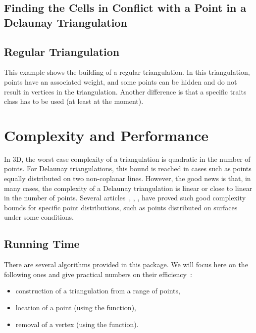 
\subsection{Finding the Cells in Conflict with a Point in a Delaunay
Triangulation}


\subsection{Regular Triangulation}
This example shows the building of a regular triangulation.  In this
triangulation, points have an associated weight, and some points can
be hidden and do not result in vertices in the triangulation.
Another difference is that a specific traits class has to be used
(at least at the moment).


\section{Complexity and Performance\label{Triangulation3-sec-complexity}}

In 3D, the worst case complexity of a triangulation is quadratic in the number
of points.  For Delaunay triangulations, this bound is reached in cases such as
points equally distributed on two non-coplanar lines.  However, the good news
is that, in many cases, the complexity of a Delaunay triangulation is linear or
close to linear in the number of points.  Several
articles~\cite{d-hdvdl-89}, \cite{e-dpssdt-02}, \cite{geometrica-5986i}, \cite{prisme-4453a,prisme-abl-03}
have proved such good complexity bounds for specific point distributions, such
as points distributed on surfaces under some conditions.

\subsection{Running Time}

There are several algorithms provided in this package.  We will focus here on
the following ones and give practical numbers on their efficiency~:
\begin{itemize}
\item construction of a triangulation from a range of points, 
\item location of a point (using the  function),
\item removal of a vertex (using the  function).
\end{itemize}

